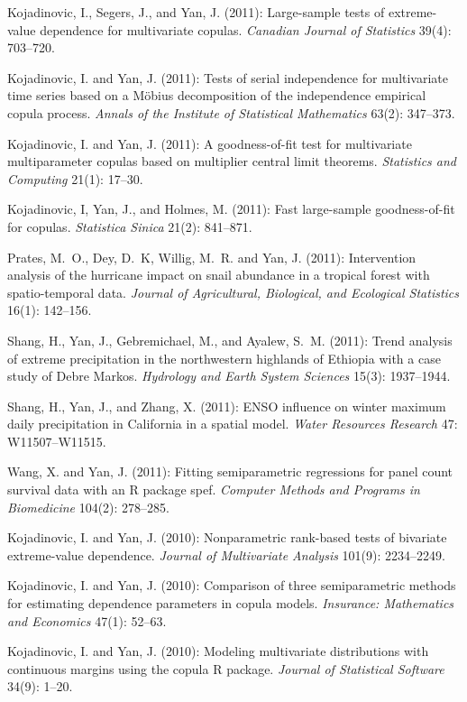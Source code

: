 \documentclass[Statistics]{vita}
\begin{document}
\begin{vita}
\begin{Publications}
\begin{RefereedJournalArticles}
  \item Kojadinovic, I., Segers, J., and Yan, J. (2011): Large-sample tests of extreme-value dependence for multivariate copulas. {\em Canadian Journal of Statistics\/} 39(4): 703--720.
  \item Kojadinovic, I. and Yan, J. (2011): Tests of serial independence for multivariate time series based on a {M\"obius} decomposition of the independence empirical copula process. {\em Annals of the Institute of Statistical Mathematics\/} 63(2): 347--373.
  \item Kojadinovic, I. and Yan, J. (2011): A goodness-of-fit test for multivariate multiparameter copulas based on multiplier central limit theorems. {\em Statistics and Computing\/} 21(1): 17--30.
  \item Kojadinovic, I, Yan, J., and Holmes, M. (2011): Fast large-sample goodness-of-fit for copulas. {\em Statistica Sinica\/} 21(2): 841--871.
  \item *Prates, M.~O., Dey, D.~K, Willig, M.~R. and Yan, J. (2011): Intervention analysis of the hurricane impact on snail abundance in a tropical forest with spatio-temporal data.  {\em Journal of Agricultural, Biological, and Ecological Statistics\/} 16(1): 142--156.
  \item *Shang, H., Yan, J., Gebremichael, M., and Ayalew, S.~M. (2011): Trend analysis of extreme precipitation in the northwestern highlands of Ethiopia with a case study of Debre Markos. {\em Hydrology and Earth System Sciences\/} 15(3): 1937--1944.
  \item *Shang, H., Yan, J., and Zhang, X. (2011): ENSO influence on winter maximum daily precipitation in California in a spatial model. {\em Water Resources Research\/} 47: W11507--W11515.
  \item *Wang, X. and Yan, J. (2011): Fitting semiparametric regressions for panel count survival data with an {R} package {spef}. {\em Computer Methods and Programs in Biomedicine\/} 104(2): 278--285.
  \item Kojadinovic, I. and Yan, J. (2010): Nonparametric rank-based tests of bivariate extreme-value dependence. {\em Journal of Multivariate Analysis\/} 101(9): 2234--2249.
  \item Kojadinovic, I. and Yan, J. (2010): Comparison of three semiparametric methods for estimating dependence parameters in copula models. {\em Insurance: Mathematics and Economics\/} 47(1): 52--63.
  \item Kojadinovic, I. and Yan, J. (2010): Modeling multivariate distributions with continuous margins using the copula R package. {\em Journal of Statistical Software\/} 34(9): 1--20.

\end{RefereedJournalArticles}
\end{Publications}
\end{vita}
\end{document}
